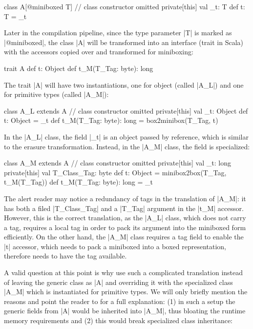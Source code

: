 \begin{lstlisting-nobreak}
 class A[@miniboxed T]{
   // class constructor omitted
   private[this] val _t: T
   def t: T = _t
 }
\end{lstlisting-nobreak}

Later in the compilation pipeline, since the type parameter |T| is marked as |@miniboxed|, the class |A| will be transformed into an interface (trait in Scala) with the accessors copied over and transformed for miniboxing:

\begin{lstlisting-nobreak}
 trait A {
   def t: Object
   def t_M(T_Tag: byte): long
 }
\end{lstlisting-nobreak}

The trait |A| will have two instantiations, one for object (called |A_L|) and one for primitive types (called |A_M|):

\begin{lstlisting-nobreak}
 class A_L extends A {
   // class constructor omitted
   private[this] val _t: Object
   def t: Object = _t
   def t_M(T_Tag: byte): long = box2minibox(T_Tag, t)
 }
\end{lstlisting-nobreak}

In the |A_L| class, the field |_t| is an object passed by reference, which is similar to the erasure transformation. Instead, in the |A_M| class, the field is specialized:

\begin{lstlisting-nobreak}
 class A_M extends A {
   // class constructor omitted
   private[this] val _t: long
   private[this] val T_Class_Tag: byte
   def t: Object = minibox2box(T_Tag, t_M(T_Tag))
   def t_M(T_Tag: byte): long = _t
 }
\end{lstlisting-nobreak}

The alert reader may notice a redundancy of tags in the translation of |A_M|: it has both a filed |T_Class_Tag| and a |T_Tag| argument in the |t_M| accessor. However, this is the correct translation, as the |A_L| class, which does not carry a tag, requires a local tag in order to pack its argument into the miniboxed form efficiently. On the other hand, the |A_M| class requires a tag field to enable the |t| accessor, which needs to pack a miniboxed into a boxed representation, therefore needs to have the tag available.

A valid question at this point is why use such a complicated translation instead of leaving the generic class as |A| and overriding it with the specialized class |A_M| which is instantiated for primitive types. We will only briefly mention the reasons and point the reader to \cite{miniboxing} for a full explanation: (1) in such a setup the generic fields from |A| would be inherited into |A_M|, thus bloating the runtime memory requirements and (2) this would break specialized class inheritance:

